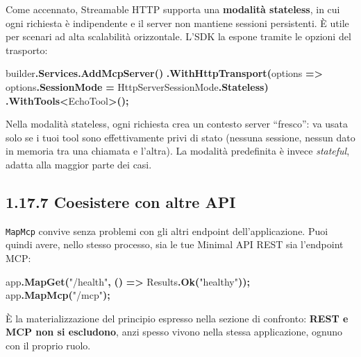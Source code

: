\documentclass[
  italian,
  10pt,
]{book}
\newenvironment{Shaded}{\begin{snugshade}}{\end{snugshade}}
\newcommand{\FunctionTok}[1]{\textcolor[rgb]{0.13,0.29,0.53}{\textbf{#1}}}
\newcommand{\NormalTok}[1]{#1}
\newcommand{\OperatorTok}[1]{\textcolor[rgb]{0.81,0.36,0.00}{\textbf{#1}}}
\newcommand{\StringTok}[1]{\textcolor[rgb]{0.31,0.60,0.02}{#1}}
\begin{document}
Come accennato, Streamable HTTP supporta una \textbf{modalità
stateless}, in cui ogni richiesta è indipendente e il server non
mantiene sessioni persistenti. È utile per scenari ad alta scalabilità
orizzontale. L'SDK la espone tramite le opzioni del trasporto:

\begin{Shaded}
\begin{Highlighting}[]
\NormalTok{builder}\OperatorTok{.}\FunctionTok{Services}\OperatorTok{.}\FunctionTok{AddMcpServer}\OperatorTok{()}
    \OperatorTok{.}\FunctionTok{WithHttpTransport}\OperatorTok{(}\NormalTok{options }\OperatorTok{=\textgreater{}}\NormalTok{ options}\OperatorTok{.}\FunctionTok{SessionMode} \OperatorTok{=}\NormalTok{ HttpServerSessionMode}\OperatorTok{.}\FunctionTok{Stateless}\OperatorTok{)}
    \OperatorTok{.}\FunctionTok{WithTools}\OperatorTok{\textless{}}\NormalTok{EchoTool}\OperatorTok{\textgreater{}();}
\end{Highlighting}
\end{Shaded}

Nella modalità stateless, ogni richiesta crea un contesto server
``fresco'': va usata solo se i tuoi tool sono effettivamente privi di
stato (nessuna sessione, nessun dato in memoria tra una chiamata e
l'altra). La modalità predefinita è invece \emph{stateful}, adatta alla
maggior parte dei casi.

\subsection{1.17.7 Coesistere con altre
API}\label{coesistere-con-altre-api}

\texttt{MapMcp} convive senza problemi con gli altri endpoint
dell'applicazione. Puoi quindi avere, nello stesso processo, sia le tue
Minimal API REST sia l'endpoint MCP:

\begin{Shaded}
\begin{Highlighting}[]
\NormalTok{app}\OperatorTok{.}\FunctionTok{MapGet}\OperatorTok{(}\StringTok{"/health"}\OperatorTok{,} \OperatorTok{()} \OperatorTok{=\textgreater{}}\NormalTok{ Results}\OperatorTok{.}\FunctionTok{Ok}\OperatorTok{(}\StringTok{"healthy"}\OperatorTok{));}
\NormalTok{app}\OperatorTok{.}\FunctionTok{MapMcp}\OperatorTok{(}\StringTok{"/mcp"}\OperatorTok{);}
\end{Highlighting}
\end{Shaded}

È la materializzazione del principio espresso nella sezione di
confronto: \textbf{REST e MCP non si escludono}, anzi spesso vivono
nella stessa applicazione, ognuno con il proprio ruolo.
\end{document}
